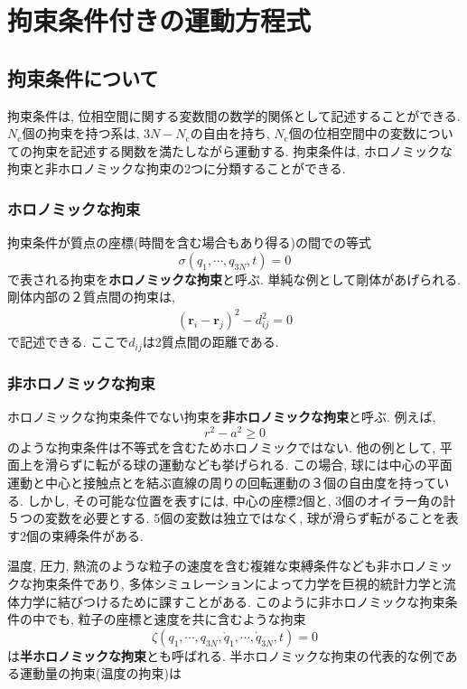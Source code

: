 \section{拘束条件付きの運動方程式}

\subsection{拘束条件について}
拘束条件は, 位相空間に関する変数間の数学的関係として記述することができる. 
$N_{\mathrm{c}}$個の拘束を持つ系は, $3N - N_{\mathrm{c}}$の自由を持ち, $N_{\mathrm{c}}$個の位相空間中の変数についての拘束を記述する関数を満たしながら運動する. 
拘束条件は, ホロノミックな拘束と非ホロノミックな拘束の2つに分類することができる. 


\subsubsection{ホロノミックな拘束}

拘束条件が質点の座標(時間を含む場合もあり得る)の間での等式
\begin{equation}
  \sigma(q_1, \cdots, q_{3N}, t) = 0
\end{equation}
で表される拘束を\textbf{ホロノミックな拘束}と呼ぶ. 
単純な例として剛体があげられる. 剛体内部の２質点間の拘束は, 
\begin{eqnarray}
  (\bm{r}_{i} - \bm{r}_{j})^{2} - d_{ij}^{2} = 0
\end{eqnarray}
で記述できる. ここで$d_{ij}$は2質点間の距離である. 


\subsubsection{非ホロノミックな拘束}

ホロノミックな拘束条件でない拘束を\textbf{非ホロノミックな拘束}と呼ぶ. 
例えば, 
\begin{equation}
  r^2 - a^2 \ge 0
\end{equation}
のような拘束条件は不等式を含むためホロノミックではない. 
他の例として, 平面上を滑らずに転がる球の運動なども挙げられる. 
この場合, 球には中心の平面運動と中心と接触点とを結ぶ直線の周りの回転運動の３個の自由度を持っている. 
しかし, その可能な位置を表すには, 中心の座標2個と, 3個のオイラー角の計５つの変数を必要とする. 5個の変数は独立ではなく, 球が滑らず転がることを表す2個の束縛条件がある. 

温度, 圧力, 熱流のような粒子の速度を含む複雑な束縛条件なども非ホロノミックな拘束条件であり, 多体シミュレーションによって力学を巨視的統計力学と流体力学に結びつけるために課すことがある. 
このように非ホロノミックな拘束条件の中でも, 粒子の座標と速度を共に含むような拘束
\begin{equation}
  \zeta(q_1, \cdots, q_{3N}, \dot{q}_{1}, \cdots, \dot{q}_{3N}, t) = 0
\end{equation}
は\textbf{半ホロノミックな拘束}とも呼ばれる. 
半ホロノミックな拘束の代表的な例である運動量の拘束(温度の拘束)は

